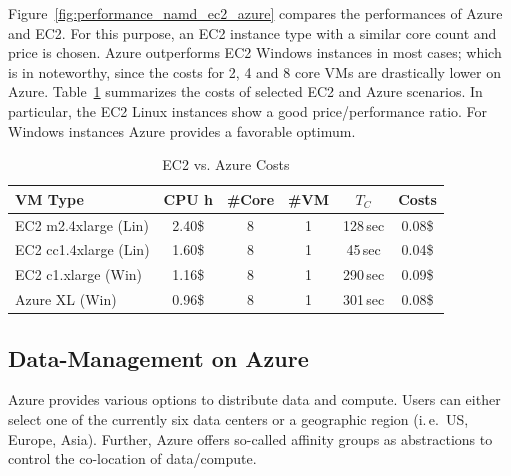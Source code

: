 \documentclass[conference,final]{IEEEtran}
\newcommand{\up}{\vspace*{-1em}}
\newcommand{\tc}{$T_{C}$ }
\begin{document}
Figure~\ref{fig:performance_namd_ec2_azure} compares the performances
of Azure and EC2. For this purpose, an EC2 instance type with a similar core
count and price is chosen. Azure outperforms EC2 Windows instances in 
most cases; which is in noteworthy, since the costs for 2, 4 and 8 core VMs are
drastically lower on Azure. Table~\ref{tbl:costs} summarizes the
costs of selected EC2 and Azure scenarios. In particular, the EC2
Linux instances show a good price/performance ratio. For Windows
instances Azure provides a favorable optimum.



\begin{table}[ht]
    \centering
	\begin{scriptsize}
		\begin{tabular}{|l|c|c|c|c|c|}
	        \hline
	        VM Type                 &CPU h  &\#Core &\#VM &\tc &Costs  \\ \hline
	        EC2 m2.4xlarge (Lin)  &2.40\$  &8          &1      &128\,sec     &0.08\$ \\ \hline
	        EC2 cc1.4xlarge (Lin) &1.60\$  &8          &1      &45\,sec     &0.04\$ \\ \hline
	        EC2 c1.xlarge   (Win)   &1.16\$  &8          &1      &290\,sec    &0.09\$ \\ \hline
	        Azure XL (Win)  &0.96\$ &8          &1      &301\,sec    &0.08\$ \\ \hline
		\end{tabular}
	\end{scriptsize}
	\caption{EC2 vs. Azure Costs\label{tbl:costs}}
	\up
\end{table}

\subsection{Data-Management on Azure}
\up Azure provides various options to distribute data and
compute. Users can either select one of the currently six data centers
or a geographic region (i.\,e.\ US, Europe, Asia). Further, Azure
offers so-called affinity groups as abstractions to control the
co-location of data/compute.
\end{document}
